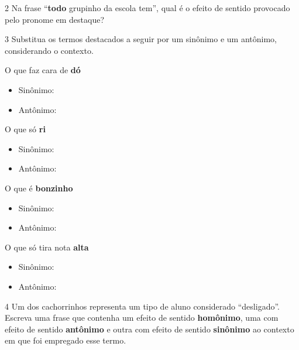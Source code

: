 
\num{2} Na frase ``\textbf{todo} grupinho da escola tem'', qual é o
efeito de sentido provocado pelo pronome em destaque?


\num{3} Substitua os termos destacados a seguir por um sinônimo e um
antônimo, considerando o contexto.

\begin{escolha}
\item O que faz cara de \textbf{dó}
\begin{itemize}
\item Sinônimo: 
\item Antônimo: 
\end{itemize}

\item O que só \textbf{ri}
\begin{itemize}
\item Sinônimo: 
\item Antônimo: 
\end{itemize}

\item O que é \textbf{bonzinho}
\begin{itemize}
\item Sinônimo: 
\item Antônimo: 
\end{itemize}

\item O que só tira nota \textbf{alta}
\begin{itemize}
\item Sinônimo: 
\item Antônimo: 
\end{itemize}
\end{escolha}

\num{4} Um dos cachorrinhos representa um tipo de aluno considerado
``desligado''. Escreva uma frase que contenha um efeito de sentido
\textbf{homônimo}, uma com efeito de sentido \textbf{antônimo} e outra
com efeito de sentido \textbf{sinônimo} ao contexto em que foi empregado
esse termo.

